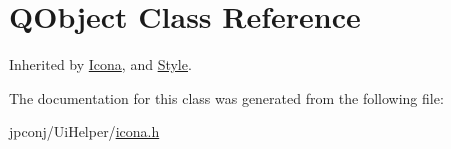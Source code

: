 \hypertarget{class_q_object}{}\section{Q\+Object Class Reference}
\label{class_q_object}


Inherited by \hyperlink{class_icona}{Icona}, and \hyperlink{class_style}{Style}.



The documentation for this class was generated from the following file\+:\begin{DoxyCompactItemize}
\item 
jpconj/\+Ui\+Helper/\hyperlink{icona_8h}{icona.\+h}\end{DoxyCompactItemize}
